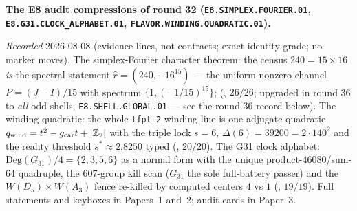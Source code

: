\par\smallskip\noindent\textbf{The E8 audit compressions of
round 32 (\texttt{E8.SIMPLEX.FOURIER.01},
\texttt{E8.G31.CLOCK\_ALPHABET.01},
\texttt{FLAVOR.WINDING.QUADRATIC.01}).}
{\sloppy
\emph{Recorded} 2026-08-08 (evidence lines, not contracts;
exact identity grade; no marker moves).  The simplex-Fourier
character theorem: the census $240 = 15\times16$ \emph{is} the
spectral statement $\hat r = (240, -16^{15})$ --- the
uniform-nonzero channel $P = (J - I)/15$ with spectrum $\{1,
(-1/15)^{15}\}$; (, $26/26$; upgraded in
round 36 to \emph{all} odd shells, \texttt{E8.SHELL.GLOBAL.01}
--- see the round-36 record below).  The
winding quadratic: the whole \texttt{tfpt\_2} winding line is
one adjugate quadratic $q_{\rm wind} = t^2 - g_{\mathrm{car}} t + |\mathbb Z_2|$
with the triple lock $s = 6$, $\Delta(6) = 39200 = 2\cdot140^2$
and the reality threshold $s^* \approx 2.8250$ typed
(, $20/20$).  The G31
clock alphabet: $\mathrm{Deg}(G_{31})/4 = \{2,3,5,6\}$ as a
normal form with the unique product-$46080$/sum-$64$ quadruple,
the $607$-group kill scan ($G_{31}$ the sole full-battery
passer) and the $W(D_5)\times W(A_3)$ fence re-killed by
computed centers $4$ vs $1$
(, $19/19$).  Full
statements and keyboxes in Papers~1 and~2; audit cards in
Paper~3.\par}

